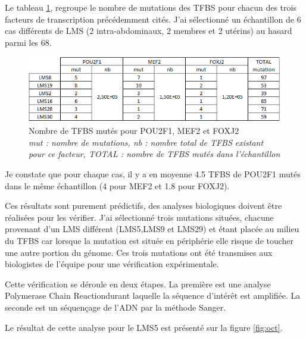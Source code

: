 Le tableau \ref{fig:tf}, regroupe le nombre de mutations des TFBS pour chacun des trois facteurs de transcription précédemment cités. J'ai sélectionné un échantillon de 6 cas différents de LMS (2 intra-abdominaux, 2 membres et 2 utérins) au hasard parmi les 68. 

\begin{figure}[h]
\renewcommand{\figurename}{Tableau}
\centering
\includegraphics[scale=1]{Figures/table.png}
\captionsetup{justification=centering}
\caption{Nombre de TFBS mutés pour POU2F1, MEF2 et FOXJ2\\
\textit{mut : nombre de mutations, nb : nombre total de TFBS existant pour ce facteur, TOTAL : nombre de TFBS mutés dans l'échantillon}}
\label{fig:tf}
\end{figure}

Je constate que pour chaque cas, il y a en moyenne 4.5 TFBS de POU2F1 mutés dans le même échantillon (4 pour MEF2 et 1.8 pour FOXJ2). 

Ces résultats sont purement prédictifs, des analyses biologiques doivent être réalisées pour les vérifier. J'ai sélectionné trois mutations situées, chacune provenant d'un LMS différent (LMS5,LMS9 et LMS29) et étant placée au milieu du TFBS car lorsque la mutation est située en périphérie elle risque de toucher une autre portion du génome. Ces trois mutations ont été transmises aux biologistes de l'équipe pour une vérification expérimentale.

Cette vérification se déroule en deux étapes. La première est une analyse \og Polymerase Chain Reaction\fg durant laquelle la séquence d'intérêt est amplifiée. La seconde est un séquençage de l'ADN par la méthode Sanger. 

Le résultat de cette analyse pour le LMS5 est présenté sur la figure \ref{fig:oct}.

